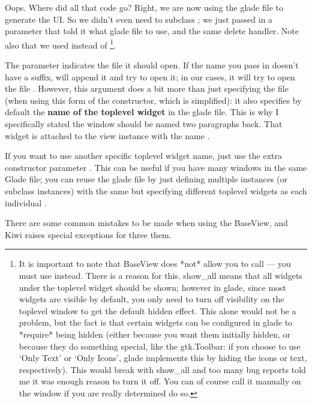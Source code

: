 \documentclass[a4paper]{howto}
\begin{document}
Oops. Where did all that code go? Right, we are now using the glade file
to generate the UI. So we didn't even need to subclass
; we just passed in a parameter that told it what glade
file to use, and the same delete handler. Note also that we used
 instead of
\footnote{ It is important to note that
BaseView does *not* allow you to call  ---
you must use  instead.  There is a reason for
this. show\_all means that all widgets under the toplevel widget should
be shown; however in glade, since most widgets are visible by default,
you only need to turn off visibility on the toplevel window to get the
default hidden effect. This alone would not be a problem, but the fact
is that certain widgets can be configured in glade to *require* being
hidden (either because you want them initially hidden, or because they
do something special, like the gtk.Toolbar: if you choose to use `Only
Text' or `Only Icons', glade implements this by hiding the icons or
text, respectively). This would break with show\_all and too many bug
reports told me it was enough reason to turn it off. You can of course
call it manually on the window if you are really determined do so.}.

The  parameter indicates the file it should open. If the
name you pass in doesn't have a  suffix, 
will append it and try to open it; in our cases, it will try to open the
file .  However, this argument does a bit more than just
specifying the file (when using this form of the constructor, which is
simplified): it also specifies by default the {\bf name of the toplevel
widget} in the glade file. This is why I specifically stated the window
should be named  two paragraphs back. That widget is attached
to the view instance with the name .

If you want to use another specific toplevel widget name, just use the
extra constructor parameter . This can be useful
if you have many windows in the same Glade file; you can reuse the glade
file by just defining multiple  instances (or subclass
instances) with the same  but specifying different
toplevel widgets as each individual .

There are some common mistakes to be made when using the BaseView, and
Kiwi raises special exceptions for three them.
\end{document}
